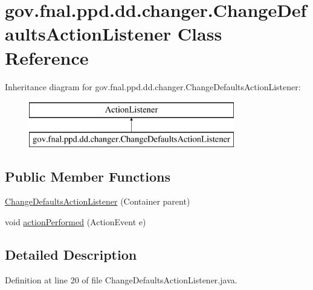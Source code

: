 \hypertarget{classgov_1_1fnal_1_1ppd_1_1dd_1_1changer_1_1ChangeDefaultsActionListener}{\section{gov.\-fnal.\-ppd.\-dd.\-changer.\-Change\-Defaults\-Action\-Listener Class Reference}
\label{classgov_1_1fnal_1_1ppd_1_1dd_1_1changer_1_1ChangeDefaultsActionListener}
}
Inheritance diagram for gov.\-fnal.\-ppd.\-dd.\-changer.\-Change\-Defaults\-Action\-Listener\-:\begin{figure}[H]
\begin{center}
\leavevmode
\includegraphics[height=2.000000cm]{classgov_1_1fnal_1_1ppd_1_1dd_1_1changer_1_1ChangeDefaultsActionListener}
\end{center}
\end{figure}
\subsection*{Public Member Functions}
\begin{DoxyCompactItemize}
\item 
\hyperlink{classgov_1_1fnal_1_1ppd_1_1dd_1_1changer_1_1ChangeDefaultsActionListener_a3b0b37ba3ebf3a0b878c7715b46c5c0c}{Change\-Defaults\-Action\-Listener} (Container parent)
\item 
void \hyperlink{classgov_1_1fnal_1_1ppd_1_1dd_1_1changer_1_1ChangeDefaultsActionListener_a29a64447afe74de6954ba633ee8775ec}{action\-Performed} (Action\-Event e)
\end{DoxyCompactItemize}


\subsection{Detailed Description}


Definition at line 20 of file Change\-Defaults\-Action\-Listener.\-java.



